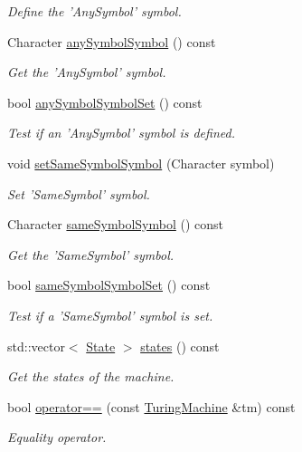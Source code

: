 \begin{DoxyCompactItemize}
\begin{DoxyCompactList}\small\item\em \-Define the '\-Any\-Symbol' symbol. \end{DoxyCompactList}\item 
\-Character \hyperlink{classtum_1_1_turing_machine_a36f9e20e8c22c0f611eceb452a65c9f1}{any\-Symbol\-Symbol} () const 
\begin{DoxyCompactList}\small\item\em \-Get the '\-Any\-Symbol' symbol. \end{DoxyCompactList}\item 
bool \hyperlink{classtum_1_1_turing_machine_a2feff205f89fe560ca7d724926514ba4}{any\-Symbol\-Symbol\-Set} () const 
\begin{DoxyCompactList}\small\item\em \-Test if an '\-Any\-Symbol' symbol is defined. \end{DoxyCompactList}\item 
void \hyperlink{classtum_1_1_turing_machine_adcaab402377ace50080933baba481c7c}{set\-Same\-Symbol\-Symbol} (\-Character symbol)
\begin{DoxyCompactList}\small\item\em \-Set '\-Same\-Symbol' symbol. \end{DoxyCompactList}\item 
\-Character \hyperlink{classtum_1_1_turing_machine_a43e57e08a386c0e49c52d96a4eedc5da}{same\-Symbol\-Symbol} () const 
\begin{DoxyCompactList}\small\item\em \-Get the '\-Same\-Symbol' symbol. \end{DoxyCompactList}\item 
bool \hyperlink{classtum_1_1_turing_machine_ae6ecb686076c010b4b1081d8f086791a}{same\-Symbol\-Symbol\-Set} () const 
\begin{DoxyCompactList}\small\item\em \-Test if a '\-Same\-Symbol' symbol is set. \end{DoxyCompactList}\item 
std\-::vector$<$ \hyperlink{classtum_1_1_state}{\-State} $>$ \hyperlink{classtum_1_1_turing_machine_aa3c6a5c5773a3f3b4f9c6e70db1e92b3}{states} () const 
\begin{DoxyCompactList}\small\item\em \-Get the states of the machine. \end{DoxyCompactList}\item 
\hypertarget{classtum_1_1_turing_machine_a36ca2c47714bfd2b66e07c8b7ea6538a}{bool \hyperlink{classtum_1_1_turing_machine_a36ca2c47714bfd2b66e07c8b7ea6538a}{operator==} (const \hyperlink{classtum_1_1_turing_machine}{\-Turing\-Machine} \&tm) const }\label{classtum_1_1_turing_machine_a36ca2c47714bfd2b66e07c8b7ea6538a}

\begin{DoxyCompactList}\small\item\em \-Equality operator. \end{DoxyCompactList}\end{DoxyCompactItemize}
